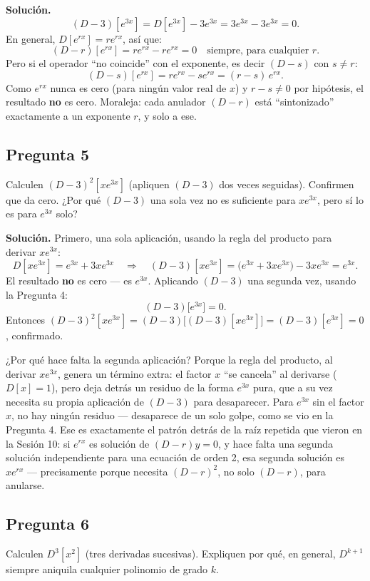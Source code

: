 \documentclass[11pt]{article}
\begin{document}
\noindent\textbf{Solución.}
\[
(D-3)[e^{3x}] = D[e^{3x}] - 3e^{3x} = 3e^{3x} - 3e^{3x} = 0.
\]
En general, $D[e^{rx}]=re^{rx}$, así que:
\[
(D-r)[e^{rx}] = re^{rx} - re^{rx} = 0 \quad \text{siempre, para cualquier } r.
\]
Pero si el operador ``no coincide'' con el exponente, es decir $(D-s)$ con $s\neq r$:
\[
(D-s)[e^{rx}] = re^{rx} - se^{rx} = (r-s)\,e^{rx}.
\]
Como $e^{rx}$ nunca es cero (para ningún valor real de $x$) y $r-s\neq 0$ por hipótesis, el resultado \textbf{no} es cero. Moraleja: cada anulador $(D-r)$ está ``sintonizado'' exactamente a un exponente $r$, y solo a ese.

\subsection*{Pregunta 5}
\begin{pregunta}
Calculen $(D-3)^2[xe^{3x}]$ (apliquen $(D-3)$ dos veces seguidas). Confirmen que da cero. ¿Por qué $(D-3)$ una sola vez no es suficiente para $xe^{3x}$, pero sí lo es para $e^{3x}$ solo?
\end{pregunta}

\noindent\textbf{Solución.} Primero, una sola aplicación, usando la regla del producto para derivar $xe^{3x}$:
\[
D[xe^{3x}] = e^{3x} + 3xe^{3x} \quad\Longrightarrow\quad (D-3)[xe^{3x}] = \big(e^{3x}+3xe^{3x}\big) - 3xe^{3x} = e^{3x}.
\]
El resultado \textbf{no} es cero — es $e^{3x}$. Aplicando $(D-3)$ una segunda vez, usando la Pregunta 4:
\[
(D-3)\big[e^{3x}\big] = 0.
\]
Entonces $(D-3)^2[xe^{3x}] = (D-3)\big[(D-3)[xe^{3x}]\big] = (D-3)[e^{3x}] = 0$, confirmado.

¿Por qué hace falta la segunda aplicación? Porque la regla del producto, al derivar $xe^{3x}$, genera un término extra: el factor $x$ ``se cancela'' al derivarse ($D[x]=1$), pero deja detrás un residuo de la forma $e^{3x}$ pura, que a su vez necesita su propia aplicación de $(D-3)$ para desaparecer. Para $e^{3x}$ sin el factor $x$, no hay ningún residuo — desaparece de un solo golpe, como se vio en la Pregunta 4. Ese es exactamente el patrón detrás de la raíz repetida que vieron en la Sesión 10: si $e^{rx}$ es solución de $(D-r)y=0$, y hace falta una segunda solución independiente para una ecuación de orden 2, esa segunda solución es $xe^{rx}$ — precisamente porque necesita $(D-r)^2$, no solo $(D-r)$, para anularse.

\subsection*{Pregunta 6}
\begin{pregunta}
Calculen $D^3[x^2]$ (tres derivadas sucesivas). Expliquen por qué, en general, $D^{k+1}$ siempre aniquila cualquier polinomio de grado $k$.
\end{pregunta}
\end{document}
